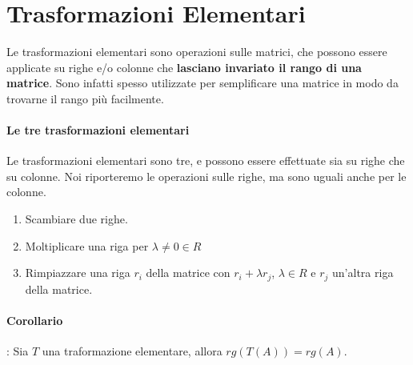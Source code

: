 \section{Trasformazioni Elementari}
Le trasformazioni elementari sono operazioni sulle matrici, che possono essere applicate su righe e/o colonne che \textbf{lasciano invariato il rango di una matrice}.
Sono infatti spesso utilizzate per semplificare una matrice in modo da trovarne il rango più facilmente.

\paragraph{Le tre trasformazioni elementari}
Le trasformazioni elementari sono tre, e possono essere effettuate sia su righe che su colonne. Noi riporteremo le operazioni sulle righe, ma sono uguali anche per le colonne.
\begin{enumerate}
	\item Scambiare due righe.
	\item Moltiplicare una riga per $\lambda \neq 0  \in R$
	\item Rimpiazzare una riga $r_i$ della matrice con $r_i + \lambda r_j$, $\lambda \in R$ e $r_j$ un'altra riga della matrice.
\end{enumerate}

\paragraph{Corollario}: Sia $T$ una traformazione elementare, allora $rg(T(A)) = rg(A)$.

